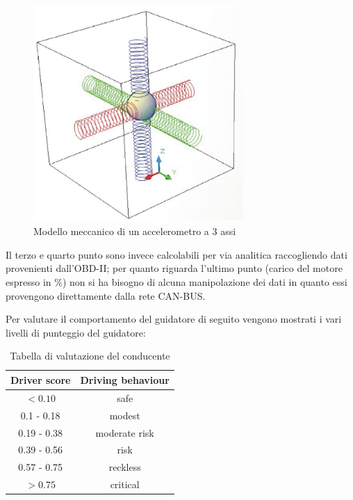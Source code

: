 \documentclass[12pt, a4paper, italian]{report}
\numberwithin{figure}{chapter}
\numberwithin{table}{chapter}
\begin{document}
\begin{figure}[h]
  \centering
  \includegraphics[width=8cm]{Accelerometro.jpg}
  \caption{Modello meccanico di un accelerometro a 3 assi}
  \label{fig:accelerometro}
\end{figure}

Il terzo e quarto punto sono invece calcolabili per via analitica raccogliendo dati provenienti dall'OBD-II; per quanto riguarda l'ultimo punto (carico del motore espresso in \%) non si ha bisogno di alcuna manipolazione dei dati in quanto essi provengono direttamente dalla rete CAN-BUS.

Per valutare il comportamento del guidatore di seguito vengono mostrati i vari livelli di punteggio del guidatore:

\begin{table}[h!]
  \centering
  \begin{tabular}{|c|c|}
    \hline
    \textbf{Driver score} & \textbf{Driving behaviour} \\
    \hline
    \(< 0.10\) & safe \\
    \hline
    0.1 - 0.18 & modest \\
    \hline
    0.19 - 0.38 & moderate risk \\
    \hline
    0.39 - 0.56 & risk \\
    \hline
     0.57 - 0.75 & reckless \\
    \hline
     \(> 0.75\) & critical \\
    \hline
  \end{tabular}
  \caption{Tabella di valutazione del conducente}
  \label{tab:tabellaValutativa}
\end{table}
\end{document}
